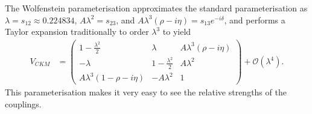 \documentclass[a4paper,12pt]{article}
\begin{document}
The Wolfenstein parameterisation approximates the standard parameterisation as $\lambda=s_{12}\approx0.224834$, $A\lambda^2=s_{23}$, and $A\lambda^3(\rho-i\eta)=s_{13}e^{-i\delta}$, and performs a Taylor expansion traditionally to order $\lambda^3$ to yield
\begin{align}
    \label{eq:wolfie}
    V_{CKM} &= \begin{pmatrix} 1-\frac{\lambda^2}{2} & \lambda & A\lambda^3(\rho-i\eta) \\ -\lambda & 1-\frac{\lambda^2}{2} & A\lambda^2 \\ A\lambda^3(1-\rho-i\eta) & -A\lambda^2 & 1\end{pmatrix} + \mathcal{O}(\lambda^4).
\end{align}
This parameterisation makes it very easy to see the relative strengths of the couplings. 
\end{document}
